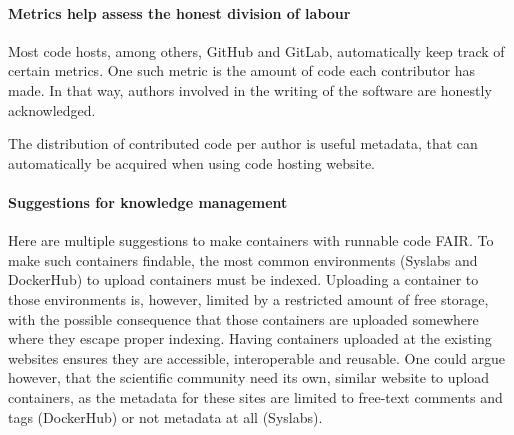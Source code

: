 \paragraph{Metrics help assess the honest division of labour}

Most code hosts, among others, GitHub and GitLab,
automatically keep track of certain metrics.
One such metric is the amount of code each contributor has made.
In that way, authors involved in the writing of the software
are honestly acknowledged. 

The distribution of contributed code per author 
is useful metadata, that can automatically
be acquired when using code hosting website.

\paragraph{Suggestions for knowledge management}

Here are multiple suggestions to make containers with runnable code FAIR.
To make such containers findable, the most common 
environments (Syslabs and DockerHub) to upload containers must be indexed.
Uploading a container to those environments is, however, limited by
a restricted amount of free storage, with the possible consequence that
those containers are uploaded somewhere where they escape proper indexing.
Having containers uploaded at the existing websites ensures they are
accessible, interoperable and reusable.
One could argue however, that the scientific community need its own,
similar website to upload containers, as the metadata for these
sites are limited to free-text comments and tags (DockerHub)
or not metadata at all (Syslabs).

